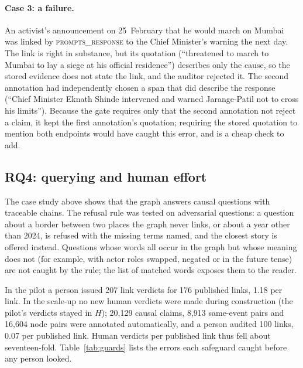 \documentclass[pdflatex,sn-basic,lineno]{sn-jnl}
\theoremstyle{thmstylethree}
\theoremstyle{thmstyleone}
\newcommand{\rel}[1]{\textsc{#1}}
\begin{document}
\paragraph{Case 3: a failure.} An activist's announcement on 25~February that he would march on
Mumbai was linked by \rel{prompts\_response} to the Chief Minister's warning the next day. The
link is right in substance, but its quotation (``threatened to march to Mumbai to lay a siege at
his official residence'') describes only the cause, so the stored evidence does not state the link,
and the auditor rejected it. The second annotation had independently chosen a span that did describe
the response (``Chief Minister Eknath Shinde intervened and warned Jarange-Patil not to cross his
limits''). Because the gate requires only that the second annotation not reject a claim, it kept the
first annotation's quotation; requiring the stored quotation to mention both endpoints would have
caught this error, and is a cheap check to add.

\subsection{RQ4: querying and human effort}
The case study above shows that the graph answers causal questions with traceable chains. The
refusal rule was tested on adversarial questions: a question about a border between two places the
graph never links, or about a year other than 2024, is refused with the missing terms named, and
the closest story is offered instead. Questions whose words all occur in the graph but whose
meaning does not (for example, with actor roles swapped, negated or in the future tense) are not
caught by the rule; the list of matched words exposes them to the reader.

In the pilot a person issued 207 link verdicts for 176 published links, 1.18 per link. In the
scale-up no new human verdicts were made during construction (the pilot's verdicts stayed in $H$);
20{,}129 causal claims, 8{,}913 same-event pairs and 16{,}604 node pairs were annotated
automatically, and a person audited 100 links, 0.07 per published link. Human
verdicts per published link thus fell about seventeen-fold. Table~\ref{tab:guards} lists the errors
each safeguard caught before any person looked.
\end{document}
